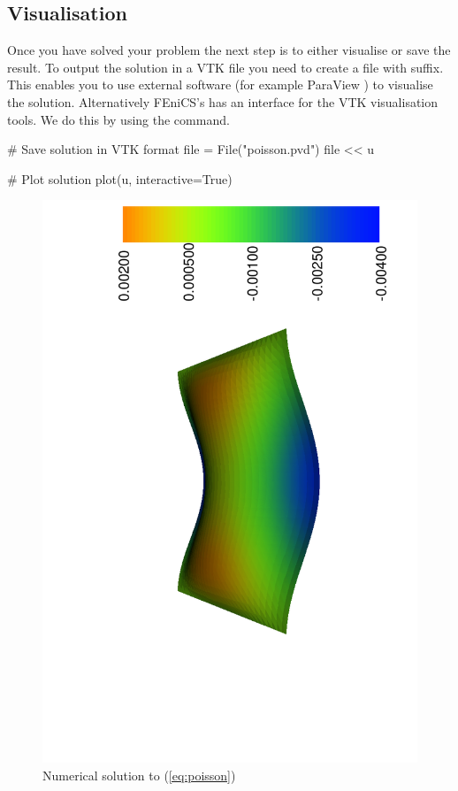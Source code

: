 \subsection{Visualisation}

Once you have solved your problem the next step is to either visualise or save the result. To output the solution in a VTK file you need to create a file with  suffix. This enables you to use external software (for example ParaView \cite{}) to visualise the solution. Alternatively FEniCS's has an interface for the VTK visualisation tools. We do this by using the  command.
\begin{pythoncode}
# Save solution in VTK format
file = File("poisson.pvd")
file << u

# Plot solution
plot(u, interactive=True)
\end{pythoncode}

\begin{figure}[h!]
  \centering
    \includegraphics[scale=.6]{../FEniCS/Figures/dolfin_plot_1}
\caption{Numerical solution to (\ref{eq:poisson})}
\end{figure}


% 
% 

